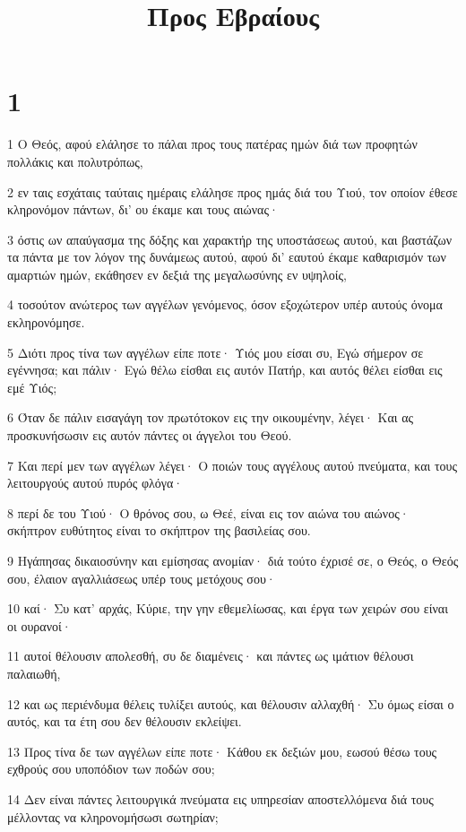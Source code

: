 

\title{Προς Εβραίους}


\chapter{1}

\par 1 Ο Θεός, αφού ελάλησε το πάλαι προς τους πατέρας ημών διά των προφητών πολλάκις και πολυτρόπως,
\par 2 εν ταις εσχάταις ταύταις ημέραις ελάλησε προς ημάς διά του Υιού, τον οποίον έθεσε κληρονόμον πάντων, δι' ου έκαμε και τους αιώνας·
\par 3 όστις ων απαύγασμα της δόξης και χαρακτήρ της υποστάσεως αυτού, και βαστάζων τα πάντα με τον λόγον της δυνάμεως αυτού, αφού δι' εαυτού έκαμε καθαρισμόν των αμαρτιών ημών, εκάθησεν εν δεξιά της μεγαλωσύνης εν υψηλοίς,
\par 4 τοσούτον ανώτερος των αγγέλων γενόμενος, όσον εξοχώτερον υπέρ αυτούς όνομα εκληρονόμησε.
\par 5 Διότι προς τίνα των αγγέλων είπε ποτε· Υιός μου είσαι συ, Εγώ σήμερον σε εγέννησα; και πάλιν· Εγώ θέλω είσθαι εις αυτόν Πατήρ, και αυτός θέλει είσθαι εις εμέ Υιός;
\par 6 Όταν δε πάλιν εισαγάγη τον πρωτότοκον εις την οικουμένην, λέγει· Και ας προσκυνήσωσιν εις αυτόν πάντες οι άγγελοι του Θεού.
\par 7 Και περί μεν των αγγέλων λέγει· Ο ποιών τους αγγέλους αυτού πνεύματα, και τους λειτουργούς αυτού πυρός φλόγα·
\par 8 περί δε του Υιού· Ο θρόνος σου, ω Θεέ, είναι εις τον αιώνα του αιώνος· σκήπτρον ευθύτητος είναι το σκήπτρον της βασιλείας σου.
\par 9 Ηγάπησας δικαιοσύνην και εμίσησας ανομίαν· διά τούτο έχρισέ σε, ο Θεός, ο Θεός σου, έλαιον αγαλλιάσεως υπέρ τους μετόχους σου·
\par 10 καί· Συ κατ' αρχάς, Κύριε, την γην εθεμελίωσας, και έργα των χειρών σου είναι οι ουρανοί·
\par 11 αυτοί θέλουσιν απολεσθή, συ δε διαμένεις· και πάντες ως ιμάτιον θέλουσι παλαιωθή,
\par 12 και ως περιένδυμα θέλεις τυλίξει αυτούς, και θέλουσιν αλλαχθή· Συ όμως είσαι ο αυτός, και τα έτη σου δεν θέλουσιν εκλείψει.
\par 13 Προς τίνα δε των αγγέλων είπε ποτε· Κάθου εκ δεξιών μου, εωσού θέσω τους εχθρούς σου υποπόδιον των ποδών σου;
\par 14 Δεν είναι πάντες λειτουργικά πνεύματα εις υπηρεσίαν αποστελλόμενα διά τους μέλλοντας να κληρονομήσωσι σωτηρίαν;

